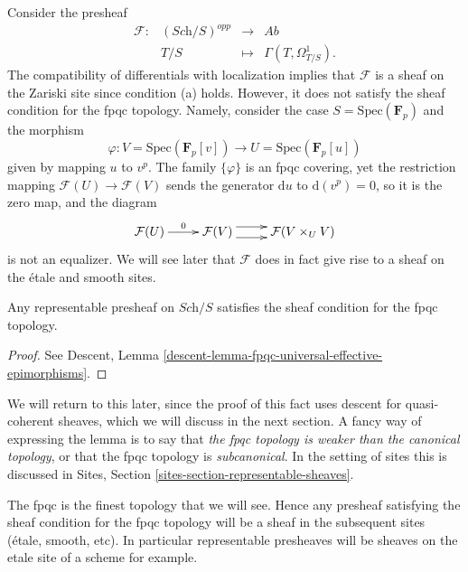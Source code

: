 \begin{example}
\label{example-quasi-coherent}
Consider the presheaf
$$
\begin{matrix}
\mathcal{F} : & (\textit{Sch}/S)^{opp} & \longrightarrow & \textit{Ab} \\
& T/S & \longmapsto & \Gamma(T, \Omega^1_{T/S}).
\end{matrix}
$$
The compatibility of differentials with localization implies that
$\mathcal{F}$ is a sheaf on the Zariski site since condition (a) holds.
However, it does not satisfy the sheaf condition for the fpqc topology.
Namely, consider the case
$S = \text{Spec}(\mathbf{F}_p)$ and the morphism
$$
\varphi :
V = \text{Spec}(\mathbf{F}_p[v])
\to
U = \text{Spec}(\mathbf{F}_p[u])
$$
given by mapping $u$ to $v^p$. The family $\{\varphi\}$ is an fpqc covering,
yet the restriction mapping
$\mathcal{F}(U) \to \mathcal{F}(V)$
sends the generator $\mathrm{d} u$ to $\mathrm{d}(v^p)
= 0$, so it is the zero map, and the diagram
$$
\xymatrix{
\mathcal{F}(U) \ar[r]^{0} &
\mathcal{F}(V) \ar@<1ex>[r] \ar@<-1ex>[r] &
\mathcal{F}(V \times_U V)
}
$$
is not an equalizer. We will see later that $\mathcal{F}$ does in fact
give rise to a sheaf on the \'etale and smooth sites.
\end{example}

\begin{lemma}
\label{lemma-representable-sheaf-fpqc}
Any representable presheaf on $\textit{Sch}/S$ satisfies the
sheaf condition for the fpqc topology.
\end{lemma}

\begin{proof}
See
Descent, Lemma \ref{descent-lemma-fpqc-universal-effective-epimorphisms}.
\end{proof}

\noindent
We will return to this later, since the proof of this fact uses
descent for quasi-coherent sheaves, which we will discuss in the next
section. A fancy way of expressing the lemma is to say that
{\it the fpqc topology is weaker than the canonical topology}, or
that the fpqc topology is {\it subcanonical}. In the setting of sites
this is discussed in
Sites, Section \ref{sites-section-representable-sheaves}.

\begin{remark}
\label{remark-fpqc-finest}
The fpqc is the finest topology that we will see. Hence any presheaf
satisfying the sheaf condition for the fpqc topology will be a
sheaf in the subsequent sites (\'etale, smooth, etc). In particular
representable presheaves will be sheaves on the etale site of a scheme
for example.
\end{remark}

